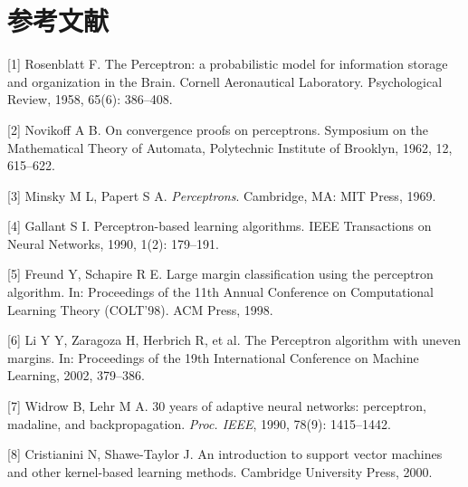 \documentclass[UTF8,12pt,a4paper,fontset=fandol]{ctexart}
\begin{document}
\section*{参考文献}

[1] Rosenblatt F. The Perceptron: a probabilistic model for information storage and organization in the Brain. Cornell Aeronautical Laboratory. Psychological Review, 1958, 65(6): 386--408.

[2] Novikoff A B. On convergence proofs on perceptrons. Symposium on the Mathematical Theory of Automata, Polytechnic Institute of Brooklyn, 1962, 12, 615--622.

[3] Minsky M L, Papert S A. \textit{Perceptrons}. Cambridge, MA: MIT Press, 1969.

[4] Gallant S I. Perceptron-based learning algorithms. IEEE Transactions on Neural Networks, 1990, 1(2): 179--191.

[5] Freund Y, Schapire R E. Large margin classification using the perceptron algorithm. In: Proceedings of the 11th Annual Conference on Computational Learning Theory (COLT'98). ACM Press, 1998.

[6] Li Y Y, Zaragoza H, Herbrich R, et al. The Perceptron algorithm with uneven margins. In: Proceedings of the 19th International Conference on Machine Learning, 2002, 379--386.

[7] Widrow B, Lehr M A. 30 years of adaptive neural networks: perceptron, madaline, and backpropagation. \textit{Proc. IEEE}, 1990, 78(9): 1415--1442.

[8] Cristianini N, Shawe-Taylor J. An introduction to support vector machines and other kernel-based learning methods. Cambridge University Press, 2000.
\end{document}
